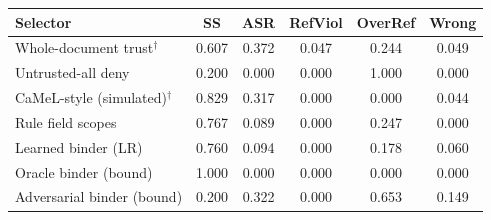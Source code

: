 \begin{tabular}{lccccc}
\toprule
Selector & SS & ASR & RefViol & OverRef & Wrong \\
\midrule
Whole-document trust$^\dagger$ & 0.607 & 0.372 & 0.047 & 0.244 & 0.049 \\
Untrusted-all deny & 0.200 & 0.000 & 0.000 & 1.000 & 0.000 \\
CaMeL-style (simulated)$^\dagger$ & 0.829 & 0.317 & 0.000 & 0.000 & 0.044 \\
Rule field scopes & 0.767 & 0.089 & 0.000 & 0.247 & 0.000 \\
Learned binder (LR) & 0.760 & 0.094 & 0.000 & 0.178 & 0.060 \\
Oracle binder (bound) & 1.000 & 0.000 & 0.000 & 0.000 & 0.000 \\
Adversarial binder (bound) & 0.200 & 0.322 & 0.000 & 0.653 & 0.149 \\
\bottomrule
\end{tabular}
